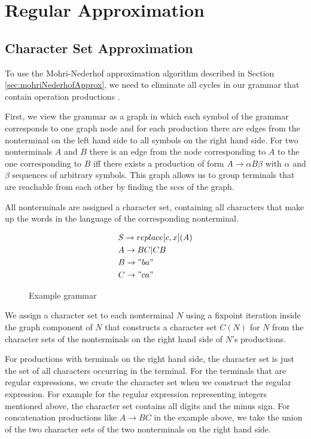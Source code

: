 \section{Regular Approximation}\label{sec:approximation}
\subsection{Character Set Approximation}\label{sec:charsetApprox}
To use the Mohri-Nederhof approximation algorithm described in Section \ref{sec:mohriNederhofApprox}, we need to eliminate all cycles in our grammar that contain operation productions \cite{mohri_nederhof}.

First, we view the grammar as a graph in which each symbol of the grammar corresponds to one graph node and for each production there are edges from the nonterminal on the left hand side to all symbols on the right hand side. 
For two nonterminals $A$ and $B$ there is an edge from the node corresponding to $A$ to the one corresponding to $B$ iff there exists a production of form $A \rightarrow \alpha B \beta$ with $\alpha$ and $\beta$ sequences of arbitrary symbols.
This graph allows us to group terminals that are reachable from each other by finding the \acp{scc} of the graph.

All nonterminals are assigned a character set, containing all characters that make up the words in the language of the corresponding nonterminal.

\begin{figure}[!h]
	\begin{align*}
		&S \rightarrow replace[c, x](A)\\
		&A \rightarrow BC | CB\\
		&B \rightarrow "ba"\\
		&C \rightarrow "ca"
	\end{align*}
	\caption{Example grammar}
	\label{fig:charset:grammar}
\end{figure}

We assign a character set to each nonterminal $N$ using a fixpoint iteration inside the graph component of $N$ that constructs a character set $C(N)$ for $N$ from the character sets of the nonterminals on the right hand side of $N$'s productions.

For productions with terminals on the right hand side, the character set is just the set of all characters occurring in the terminal. For the terminals that are regular expressions, we create the character set when we construct the regular expression. For example for the regular expression representing integers mentioned above, the character set contains all digits and the minus sign.
For concatenation productions like $A \rightarrow BC$ in the example above, we take the union of the two character sets of the two nonterminals on the right hand side.

